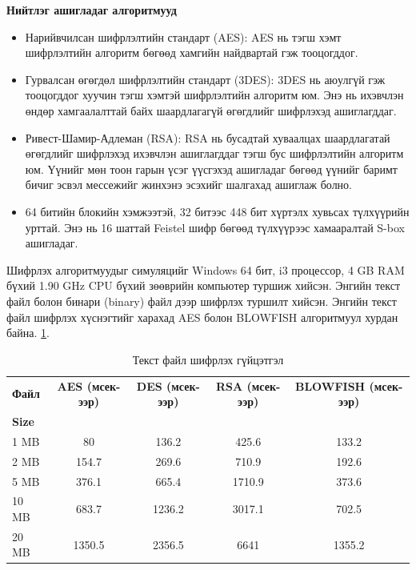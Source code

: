 \textbf{Нийтлэг ашигладаг алгоритмууд}
\begin{itemize}
    \item Нарийвчилсан шифрлэлтийн стандарт (AES): AES нь тэгш хэмт шифрлэлтийн алгоритм бөгөөд хамгийн найдвартай гэж тооцогддог.
    \item Гурвалсан өгөгдөл шифрлэлтийн стандарт (3DES): 3DES нь аюулгүй гэж тооцогддог хуучин тэгш хэмтэй шифрлэлтийн алгоритм юм. Энэ нь ихэвчлэн өндөр хамгаалалттай байх шаардлагагүй өгөгдлийг шифрлэхэд ашиглагддаг.
    \item Ривест-Шамир-Адлеман (RSA): RSA нь бусадтай хуваалцах шаардлагатай өгөгдлийг шифрлэхэд ихэвчлэн ашиглагддаг тэгш бус шифрлэлтийн алгоритм юм. Үүнийг мөн тоон гарын үсэг үүсгэхэд ашигладаг бөгөөд үүнийг баримт бичиг эсвэл мессежийг жинхэнэ эсэхийг шалгахад ашиглаж болно.
    \item 64 битийн блокийн хэмжээтэй, 32 битээс 448 бит хүртэлх хувьсах түлхүүрийн урттай. Энэ нь 16 шаттай Feistel шифр бөгөөд түлхүүрээс хамааралтай S-box ашигладаг. 
\end{itemize}
Шифрлэх алгоритмуудыг симуляцийг Windows 64 бит, i3 процессор, 4 GB RAM бүхий 1.90 GHz CPU бүхий зөөврийн компьютер туршиж хийсэн. Энгийн текст файл болон бинари (binary) файл дээр шифрлэх туршилт хийсэн. 
Энгийн текст файл шифрлэх хүснэгтийг харахад AES болон BLOWFISH алгоритмуул хурдан байна. \ref{tab:encrypt_performance_text}.
\begin{table}[H]
  \centering
  \footnotesize
  \begin{tabular}{|l|c|c|c|c|}
    \hline
    \textbf{Файл} & \textbf{AES (мсек-ээр)} & \textbf{DES (мсек-ээр)} & \textbf{RSA (мсек-ээр)} & \textbf{BLOWFISH (мсек-ээр)} \\
    \textbf{Size} & & & & \\
    \hline
    1 MB & 80 & 136.2 & 425.6 & 133.2 \\
    \hline
    2 MB & 154.7 & 269.6 & 710.9 & 192.6 \\
    \hline
    5 MB & 376.1 & 665.4 & 1710.9 & 373.6 \\
    \hline
    10 MB & 683.7 & 1236.2 & 3017.1 & 702.5 \\
    \hline
    20 MB & 1350.5 & 2356.5 & 6641 & 1355.2 \\
    \hline
  \end{tabular}
  \caption{Текст файл шифрлэх гүйцэтгэл}
  \label{tab:encrypt_performance_text}
\end{table}

